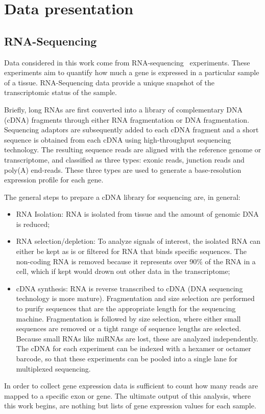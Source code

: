 \chapter{Data presentation}\label{ch:data}
\section{RNA-Sequencing}\label{sec:rnaseq}
Data considered in this work come from RNA-sequencing~\cite{wang2009rna} experiments. These experiments aim to quantify how much a gene is expressed in a particular sample of a tissue. RNA-Sequencing data provide a unique snapshot of the transcriptomic status of the sample. 

Briefly, long RNAs are first converted into a library of complementary DNA (cDNA) fragments through either RNA fragmentation or DNA fragmentation. Sequencing adaptors are subsequently added to each cDNA fragment and a short sequence is obtained from each cDNA using high-throughput sequencing technology. The resulting sequence reads are aligned with the reference genome or transcriptome, and classified as three types: exonic reads, junction reads and poly(A) end-reads. These three types are used to generate a base-resolution expression profile for each gene.

The general steps to prepare a cDNA library for sequencing are, in general:
\begin{itemize}
\item RNA Isolation: RNA is isolated from tissue and the amount of genomic DNA is reduced;
\item RNA selection/depletion: To analyze signals of interest, the isolated RNA can either be kept as is or filtered for RNA that binds specific sequences. The non-coding RNA is removed because it represents over 90$\%$ of the RNA in a cell, which if kept would drown out other data in the transcriptome;
\item cDNA synthesis: RNA is reverse transcribed to cDNA (DNA sequencing technology is more mature). Fragmentation and size selection are performed to purify sequences that are the appropriate length for the sequencing machine.  Fragmentation is followed by size selection, where either small sequences are removed or a tight range of sequence lengths are selected. Because small RNAs like miRNAs are lost, these are analyzed independently. The cDNA for each experiment can be indexed with a hexamer or octamer barcode, so that these experiments can be pooled into a single lane for multiplexed sequencing.
\end{itemize}
In order to collect gene expression data is sufficient to count how many reads are mapped to a specific exon or gene. The ultimate output of this analysis, where this work begins, are nothing but lists of gene expression values for each sample.
